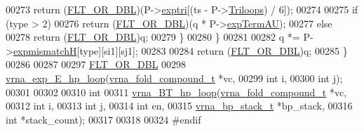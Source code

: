 \begin{DoxyCode}
00273         \textcolor{keywordflow}{return} (\mbox{\hyperlink{group__data__structures_ga31125aeace516926bf7f251f759b6126}{FLT\_OR\_DBL}})(P->\mbox{\hyperlink{group__energy__parameters_a076792cfccdc10ace2dbe2b7a8d3c5df}{exptri}}[(ts - P->\mbox{\hyperlink{group__energy__parameters_a309a8d464478a36963c36d91110920b6}{Triloops}}) / 6]);
00274 
00275       \textcolor{keywordflow}{if} (type > 2)
00276         \textcolor{keywordflow}{return} (\mbox{\hyperlink{group__data__structures_ga31125aeace516926bf7f251f759b6126}{FLT\_OR\_DBL}})(q * P->\mbox{\hyperlink{group__energy__parameters_a9040df20dfcfeabaef375edb88a15326}{expTermAU}});
00277       \textcolor{keywordflow}{else}
00278         \textcolor{keywordflow}{return} (\mbox{\hyperlink{group__data__structures_ga31125aeace516926bf7f251f759b6126}{FLT\_OR\_DBL}})q;
00279     \}
00280   \}
00281 
00282   q *= P->\mbox{\hyperlink{group__energy__parameters_a3638d270ea7979d80a75a7199a19717e}{expmismatchH}}[type][si1][sj1];
00283 
00284   \textcolor{keywordflow}{return} (\mbox{\hyperlink{group__data__structures_ga31125aeace516926bf7f251f759b6126}{FLT\_OR\_DBL}})q;
00285 \}
00286 
00287 
00297 \mbox{\hyperlink{group__data__structures_ga31125aeace516926bf7f251f759b6126}{FLT\_OR\_DBL}}
00298 \mbox{\hyperlink{group__loops_gac9f49b31d3ec1d9040798b05506c71da}{vrna\_exp\_E\_hp\_loop}}(\mbox{\hyperlink{group__fold__compound_structvrna__fc__s}{vrna\_fold\_compound\_t}} *vc,
00299                    \textcolor{keywordtype}{int}                  i,
00300                    \textcolor{keywordtype}{int}                  j);
00301 
00302 
00310 \textcolor{keywordtype}{int}
00311 \mbox{\hyperlink{group__loops_ga6c4ba14d24f716d0ca9021771357e903}{vrna\_BT\_hp\_loop}}(\mbox{\hyperlink{group__fold__compound_structvrna__fc__s}{vrna\_fold\_compound\_t}}  *vc,
00312                 \textcolor{keywordtype}{int}                   i,
00313                 \textcolor{keywordtype}{int}                   j,
00314                 \textcolor{keywordtype}{int}                   en,
00315                 \mbox{\hyperlink{group__data__structures_structvrna__bp__stack__s}{vrna\_bp\_stack\_t}}       *bp\_stack,
00316                 \textcolor{keywordtype}{int}                   *stack\_count);
00317 
00318 
00324 \textcolor{preprocessor}{#endif}
\end{DoxyCode}
